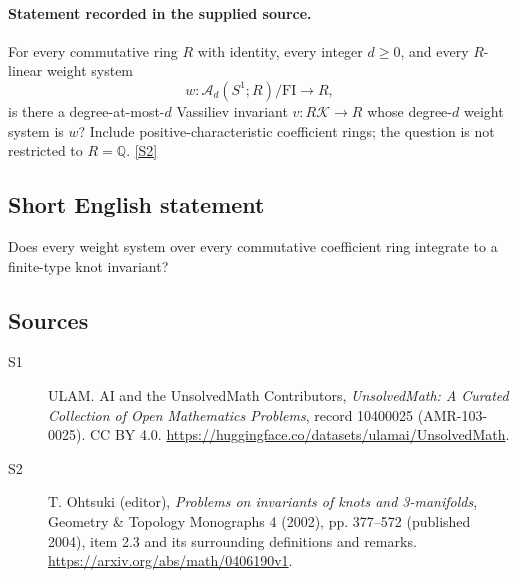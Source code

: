 \documentclass[11pt]{article}
\newcommand{\sref}[2]{\hyperlink{source:#1:#2}{[S#2]}}
\begin{document}
\paragraph{Statement recorded in the supplied source.}
For every commutative ring $R$ with identity, every integer $d\ge0$, and every $R$-linear weight system
\[w:\mathcal A_d(S^1;R)/\mathrm{FI}\longrightarrow R,\]
is there a degree-at-most-$d$ Vassiliev invariant $v:R\mathcal K\to R$ whose degree-$d$ weight system is $w$? Include positive-characteristic coefficient rings; the question is not restricted to $R=\mathbb Q$. \sref{10400025}{2}
\subsection{Short English statement}
Does every weight system over every commutative coefficient ring integrate to a finite-type knot invariant?
\subsection{Sources}
\begin{description}
\item[\hypertarget{source:10400025:1}{S1}] ULAM. AI and the UnsolvedMath Contributors, \emph{UnsolvedMath: A Curated Collection of Open Mathematics Problems}, record 10400025 (AMR-103-0025). CC BY 4.0. \url{https://huggingface.co/datasets/ulamai/UnsolvedMath}.
\item[\hypertarget{source:10400025:2}{S2}] T. Ohtsuki (editor), \emph{Problems on invariants of knots and 3-manifolds}, Geometry \& Topology Monographs 4 (2002), pp. 377--572 (published 2004), item 2.3 and its surrounding definitions and remarks. \url{https://arxiv.org/abs/math/0406190v1}.
\end{description}
\label{end:10400025}
\end{document}
